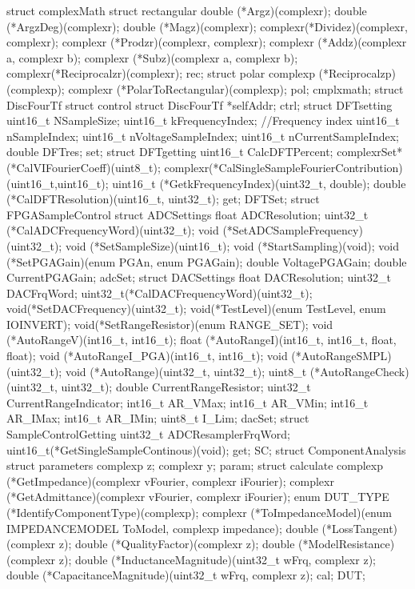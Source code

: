 struct complexMath{
  struct rectangular{
    double  (*Argz)(complexr);
    double  (*ArgzDeg)(complexr);
    double  (*Magz)(complexr);
    complexr(*Dividez)(complexr, complexr);
    complexr (*Prodzr)(complexr, complexr);
    complexr (*Addz)(complexr a, complexr b);
    complexr (*Subz)(complexr a, complexr b);
    complexr(*Reciprocalzr)(complexr);
  }rec;
  struct polar{
	complexp (*Reciprocalzp)(complexp);
	complexr (*PolarToRectangular)(complexp);
  }pol;
}cmplxmath;
struct DiscFourTf{
	struct control{
		struct DiscFourTf *selfAddr;
	}ctrl;
	struct DFTsetting{
		uint16_t NSampleSize;
		uint16_t kFrequencyIndex; //Frequency index
		uint16_t nSampleIndex;
		uint16_t nVoltageSampleIndex;
		uint16_t nCurrentSampleIndex;
		double DFTres;
	}set;
	struct DFTgetting{
		uint16_t CalcDFTPercent;
		complexrSet*(*CalVIFourierCoeff)(uint8_t);
		complexr(*CalSingleSampleFourierContribution)(uint16_t,uint16_t);
		uint16_t (*GetkFrequencyIndex)(uint32_t, double);
		double (*CalDFTResolution)(uint16_t, uint32_t);
	}get;
}DFTSet;
struct FPGASampleControl{
	struct ADCSettings{
		float ADCResolution;
		uint32_t (*CalADCFrequencyWord)(uint32_t);
		void (*SetADCSampleFrequency)(uint32_t);
		void (*SetSampleSize)(uint16_t);
		void (*StartSampling)(void);
		void (*SetPGAGain)(enum PGAn, enum PGAGain);
		double VoltagePGAGain;
		double CurrentPGAGain;
	}adcSet;
	struct DACSettings{
		float DACResolution;
		uint32_t DACFrqWord;
		uint32_t(*CalDACFrequencyWord)(uint32_t);
		void(*SetDACFrequency)(uint32_t);
		void(*TestLevel)(enum TestLevel, enum IOINVERT);
		void(*SetRangeResistor)(enum RANGE_SET);
		void (*AutoRangeV)(int16_t, int16_t);
		float (*AutoRangeI)(int16_t, int16_t, float, float);
		void (*AutoRangeI_PGA)(int16_t, int16_t);
		void (*AutoRangeSMPL)(uint32_t);
		void (*AutoRange)(uint32_t, uint32_t);
		uint8_t (*AutoRangeCheck)(uint32_t, uint32_t);
		double CurrentRangeResistor;
		uint32_t CurrentRangeIndicator;
		int16_t AR_VMax;
		int16_t AR_VMin;
		int16_t AR_IMax;
		int16_t AR_IMin;
		uint8_t I_Lim;
	}dacSet;
	struct SampleControlGetting{
		uint32_t ADCResamplerFrqWord;
		uint16_t(*GetSingleSampleContinous)(void);
	}get;
}SC;
struct ComponentAnalysis{
	struct parameters{
		complexp z;
		complexr y;
	}param;
	struct calculate{
		complexp (*GetImpedance)(complexr vFourier, complexr iFourier);
		complexr (*GetAdmittance)(complexr vFourier, complexr iFourier);
		enum DUT_TYPE (*IdentifyComponentType)(complexp);
		complexr (*ToImpedanceModel)(enum IMPEDANCEMODEL ToModel, complexp impedance);
		double (*LossTangent)(complexr z);
		double (*QualityFactor)(complexr z);
		double (*ModelResistance)(complexr z);
		double (*InductanceMagnitude)(uint32_t wFrq, complexr z);
		double (*CapacitanceMagnitude)(uint32_t wFrq, complexr z);
	}cal;
}DUT;


